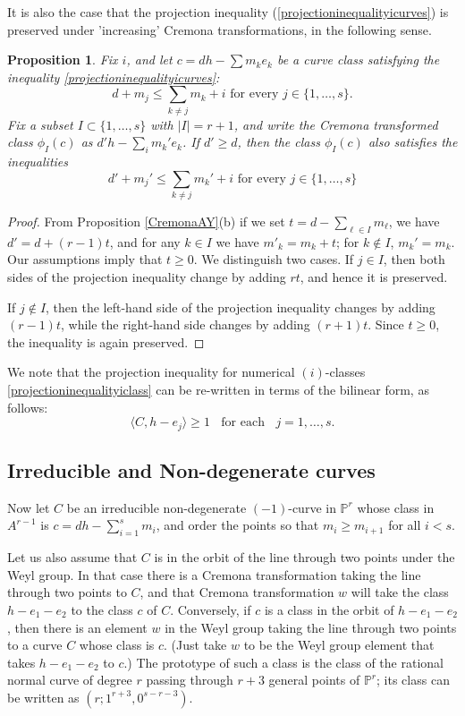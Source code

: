 \documentclass[12pt]{article}
\numberwithin{equation}{section}
\newtheorem{proposition}[equation]{Proposition}
\numberwithin{equation}{section}
\numberwithin{subeq}{equation}
\def\bbP{\mathbb{P}}
\begin{document}
It is also the case that the projection inequality (\ref{projectioninequalityicurves})
is preserved under 'increasing' Cremona transformations, in the following sense.

\begin{proposition}\label{cremonaprojection}
Fix $i$, and let $c=dh-\sum m_ke_k$ be a curve class satisfying the inequality  \eqref{projectioninequalityicurves}:
\[
d+m_j \leq \sum_{k\neq j} m_k + i \text{ for every } j \in \{1,\ldots, s\}.
\]
Fix a subset $I\subset \{1,\ldots,s\}$ with $|I|=r+1$,
and write the Cremona transformed class $\phi_I(c)$ as $d'h-\sum_i m_k'e_k$.
If $d' \geq d$, then the class $\phi_I(c)$ also satisfies the inequalities
\[
d'+m_j' \leq \sum_{k\neq j} m_k' + i \text{ for every } j\in \{1,\ldots, s\}
\]
\end{proposition}

\begin{proof}
From Proposition \ref{CremonaAY}(b) if we set $t=d-\sum_{\ell \in I}m_\ell$,
we have $d'=d+(r-1)t$, 
and for any $k\in I$ we have $m'_k=m_k+t$;
for $k \notin I$, $m_k'=m_k$.
Our assumptions imply that $t \geq 0$.
We distinguish two cases.
If $j\in I$, then both sides of the projection inequality
change by adding $rt$, and hence it is preserved.

If $j \notin I$, then the left-hand side of the projection inequality changes by adding $(r-1)t$,
while the right-hand side changes by adding $(r+1)t$.
Since $t \geq 0$, the inequality is again preserved.
	
\end{proof}

We note that the projection inequality for numerical $(i)$-classes
\eqref{projectioninequalityiclass}
can be re-written in terms of the bilinear form, as follows:
\begin{equation}\label{bilinearprojinequality}
\langle C,h-e_j\rangle \geq 1 \;\;\text{ for each }\;\; j = 1,\ldots,s.
\end{equation}

\subsection{Irreducible and Non-degenerate curves}

Now let $C$ be an irreducible non-degenerate $(-1)$-curve in $\bbP^r$
whose class in $A^{r-1}$ is $c=dh-\sum_{i=1}^s m_i$,
and order the points so that $m_i \geq m_{i+1}$ for all $i < s$.

Let us also assume that $C$ is in the orbit of 
the line through two points under the Weyl group.
In that case there is a Cremona transformation taking the line through two points to $C$,
and that Cremona transformation $w$ will take the class $h-e_1-e_2$
to the class $c$ of $C$.
Conversely, if $c$ is a class in the orbit of $h-e_1-e_2$,
then there is an element $w$ in the Weyl group
taking the line through two points to a curve $C$ whose class is $c$.
(Just take $w$ to be the Weyl group element that takes $h-e_1-e_2$ to $c$.)
The prototype of such a class is the class of the rational normal curve of degree $r$
passing through $r+3$ general points of $\bbP^r$;
its class can be written as $(r;1^{r+3},0^{s-r-3})$.
\end{document}
